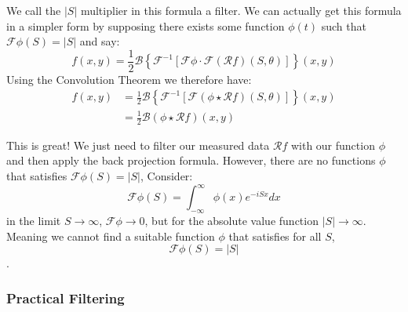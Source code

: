 \documentclass{article}
\theoremstyle{definition}
\begin{document}
We call the $|S|$ multiplier in this formula a filter. We can actually get this formula in a simpler form by supposing there exists some function $\phi(t)$ such that $\mathcal{F}\phi (S) = |S|$ and say:
$$
f(x,y) = \frac{1}{2} \mathcal{B} \left\lbrace \mathcal{F}^{-1} \left[ \mathcal{F}\phi \cdot \mathcal{F} \left( \mathcal{R}f \right) \left( S, \theta \right) \right] \right\rbrace (x,y)
$$
Using the Convolution Theorem \cite{wolfram_convolution} we therefore have:
\begin{align*}
f(x,y) &= \frac{1}{2} \mathcal{B} \left\lbrace \mathcal{F}^{-1} \left[ \mathcal{F} \left(\phi \star \mathcal{R}f \right) \left( S, \theta \right) \right] \right\rbrace (x,y) \\
&= \frac{1}{2} \mathcal{B} \left(\phi \star \mathcal{R}f \right) (x,y)
\end{align*}

This is great! We just need to filter our measured data $\mathcal{R}f$ with our function $\phi$ and then apply the back projection formula. However, there are no functions $\phi$ that satisfies $\mathcal{F} \phi(S) = |S|$, Consider:
$$
\mathcal{F}\phi(S) = \int_{-\infty}^{\infty} \phi(x)e^{-iSx} dx
$$
in the limit $S \to \infty$, $\mathcal{F}\phi \to 0$, but for the absolute value function $|S| \to \infty$. Meaning we cannot find a suitable function $\phi$ that satisfies for all $S$, 
$$\mathcal{F}\phi(S) = |S|$$.

\subsubsection{Practical Filtering}




\end{document}
